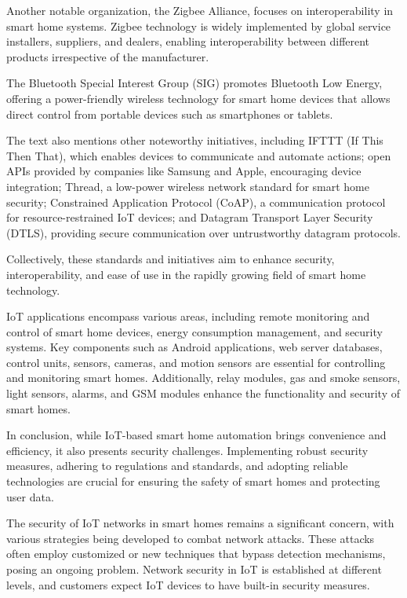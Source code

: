Another notable organization, the Zigbee Alliance, focuses on interoperability in smart home systems. Zigbee technology is widely implemented by global service installers, suppliers, and dealers, enabling interoperability between different products irrespective of the manufacturer.

The Bluetooth Special Interest Group (SIG) promotes Bluetooth Low Energy, offering a power-friendly wireless technology for smart home devices that allows direct control from portable devices such as smartphones or tablets.

The text also mentions other noteworthy initiatives, including IFTTT (If This Then That), which enables devices to communicate and automate actions; open APIs provided by companies like Samsung and Apple, encouraging device integration; Thread, a low-power wireless network standard for smart home security; Constrained Application Protocol (CoAP), a communication protocol for resource-restrained IoT devices; and Datagram Transport Layer Security (DTLS), providing secure communication over untrustworthy datagram protocols.

Collectively, these standards and initiatives aim to enhance security, interoperability, and ease of use in the rapidly growing field of smart home technology.

IoT applications encompass various areas, including remote monitoring and control of smart home devices, energy consumption management, and security systems. Key components such as Android applications, web server databases, control units, sensors, cameras, and motion sensors are essential for controlling and monitoring smart homes. Additionally, relay modules, gas and smoke sensors, light sensors, alarms, and GSM modules enhance the functionality and security of smart homes.

In conclusion, while IoT-based smart home automation brings convenience and efficiency, it also presents security challenges. Implementing robust security measures, adhering to regulations and standards, and adopting reliable technologies are crucial for ensuring the safety of smart homes and protecting user data.

The security of IoT networks in smart homes remains a significant concern, with various strategies being developed to combat network attacks. These attacks often employ customized or new techniques that bypass detection mechanisms, posing an ongoing problem. Network security in IoT is established at different levels, and customers expect IoT devices to have built-in security measures.

